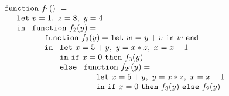 \begin{equation}
\label{FunctionalConstructionProgramLCUnrolled}
\begin{array}{l}
\mathtt{function}\ f_1()\ = \\
  \quad
  \begin{array}{l}
     \mathtt{let}\ v = 1, \ 
                   z = 8, \ 
                   y = 4\\
     \mathtt{in}\ 
     \begin{array}[t]{l}
       \mathtt{function}\ f_2(y) = \\
       \quad \begin{array}{l}  
               \mathtt{function}\ f_3(y) = \letin w {y+v} w\\
               \mathtt{in}\
               \begin{array}[t]{l}
                  \mathtt{let}\ x = {5+y}, \
                                y = {x*z}, \
                                x = {x-1}\\ 
                  \mathtt{in\ if}\ {x=0}\
                  \mathtt{then}\ {\call {f_3} {y}}\\
                  \mathtt{else}\
                   \begin{array}[t]{l}
                      \mathtt{function}\ f_{2'}(y) = \\
                      \quad \begin{array}[t]{l}
                              \mathtt{let}\ x = {5+y}, \
                                            y = {x*z}, \
                                            x = {x-1}\\ 
                              \mathtt{in}\ 
                                \ite {x=0} {\call {f_3} {y}} {\call {f_2} {y}}\

\end{array}
\end{array}
\end{array}
\end{array}
\end{array}
\end{array}
\end{array}
\end{equation}

